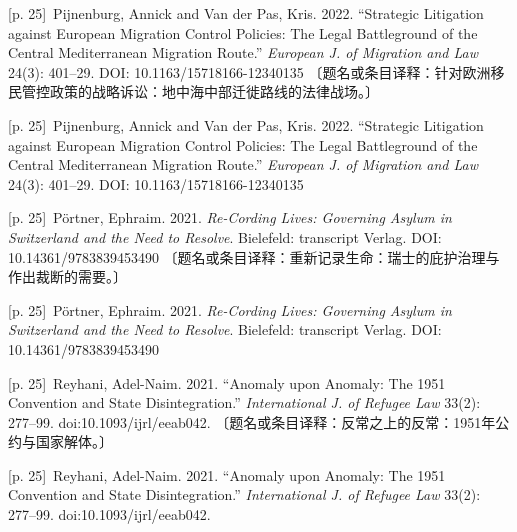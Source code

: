 \documentclass[10pt,a4paper]{article}
\begin{document}
\noindent\begin{minipage}{\textwidth}\begin{minipage}[t]{\dimexpr.5\textwidth-4mm\relax}{\scriptsize\color{gray} [p. 25]}\ Pijnenburg, Annick and Van der Pas, Kris. 2022. “Strategic Litigation against European Migration Control Policies: The Legal Battleground of the Central Mediterranean Migration Route.” \textit{European J. of Migration and Law} 24(3): 401–29. DOI: 10.1163/15718166-12340135 〔题名或条目译释：针对欧洲移民管控政策的战略诉讼：地中海中部迁徙路线的法律战场。〕\par\end{minipage}\hfill\begin{minipage}[t]{\dimexpr.5\textwidth-4mm\relax}{\scriptsize\color{gray} [p. 25]}\ Pijnenburg, Annick and Van der Pas, Kris. 2022. “Strategic Litigation against European Migration Control Policies: The Legal Battleground of the Central Mediterranean Migration Route.” \textit{European J. of Migration and Law} 24(3): 401–29. DOI: 10.1163/15718166-12340135\par\end{minipage}\end{minipage}\par
\noindent\begin{minipage}{\textwidth}\begin{minipage}[t]{\dimexpr.5\textwidth-4mm\relax}{\scriptsize\color{gray} [p. 25]}\ Pörtner, Ephraim. 2021. \textit{Re-Cording Lives: Governing Asylum in Switzerland and the Need to Resolve}. Bielefeld: transcript Verlag. DOI: 10.14361/9783839453490 〔题名或条目译释：重新记录生命：瑞士的庇护治理与作出裁断的需要。〕\par\end{minipage}\hfill\begin{minipage}[t]{\dimexpr.5\textwidth-4mm\relax}{\scriptsize\color{gray} [p. 25]}\ Pörtner, Ephraim. 2021. \textit{Re-Cording Lives: Governing Asylum in Switzerland and the Need to Resolve}. Bielefeld: transcript Verlag. DOI: 10.14361/9783839453490\par\end{minipage}\end{minipage}\par
\noindent\begin{minipage}{\textwidth}\begin{minipage}[t]{\dimexpr.5\textwidth-4mm\relax}{\scriptsize\color{gray} [p. 25]}\ Reyhani, Adel-Naim. 2021. “Anomaly upon Anomaly: The 1951 Convention and State Disintegration.” \textit{International J. of Refugee Law} 33(2): 277–99. doi:10.1093/ijrl/eeab042. 〔题名或条目译释：反常之上的反常：1951年公约与国家解体。〕\par\end{minipage}\hfill\begin{minipage}[t]{\dimexpr.5\textwidth-4mm\relax}{\scriptsize\color{gray} [p. 25]}\ Reyhani, Adel-Naim. 2021. “Anomaly upon Anomaly: The 1951 Convention and State Disintegration.” \textit{International J. of Refugee Law} 33(2): 277–99. doi:10.1093/ijrl/eeab042.\par\end{minipage}\end{minipage}\par
\end{document}

